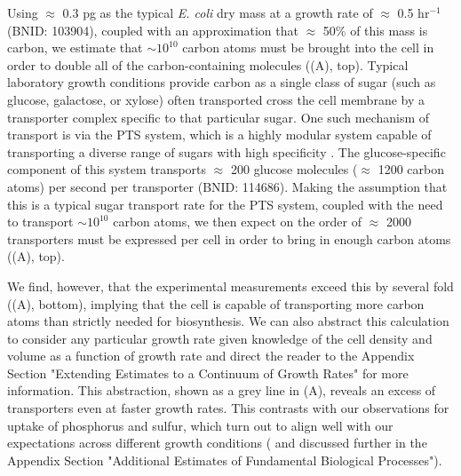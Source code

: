 Using $\approx$ 0.3 pg as the typical \textit{E. coli} dry mass at a growth rate
of $\approx$ 0.5 hr$^{-1}$ (BNID: 103904), coupled with an approximation that
$\approx$ 50\% of this mass is carbon, we estimate that $\sim 10^{10}$ carbon
atoms must be brought into the cell in order to double all of the
carbon-containing molecules ((A), top). Typical laboratory
growth conditions provide carbon as a single class of sugar (such as glucose,
galactose, or xylose) often transported cross the cell membrane by a transporter
complex specific to that particular sugar. One such mechanism of transport is
via the PTS system, which is a highly modular system capable of transporting a
diverse range of sugars with high specificity \citep{escalante2012}. The
glucose-specific component of this system transports $\approx$ 200 glucose
molecules ($\approx$ 1200 carbon atoms) per second per transporter (BNID:
114686). Making the assumption that this is a typical sugar transport rate for
the PTS system, coupled with the need to transport $\sim 10^{10}$ carbon atoms,
we then expect on the order of $\approx$ 2000 transporters must be expressed per
cell in order to bring in enough carbon atoms ((A), top).

We find, however, that the experimental measurements exceed this by several fold
((A), bottom), implying that the cell is capable of
transporting more carbon atoms than strictly needed for biosynthesis. We can
also abstract this calculation to consider any particular growth rate given
knowledge of the cell density and volume as a function of growth rate and direct
the reader to the Appendix Section "Extending Estimates to a Continuum of Growth Rates" for more
information. This abstraction, shown as a grey line in (A),
reveals an excess of transporters even at faster growth rates. This contrasts
with our observations for uptake of phosphorus and sulfur, which turn out to
align well with our expectations across different growth conditions
( and discussed further in the Appendix
Section "Additional Estimates of Fundamental Biological Processes").

